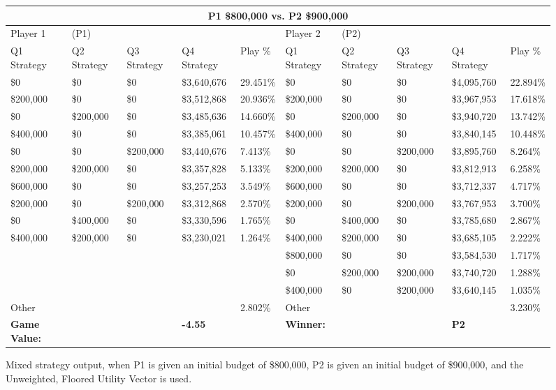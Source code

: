 \documentclass[11pt]{article}
\begin{document}
\begin{figure}
\tiny
\begin{tabular}{ |p{1.0cm}p{1.0cm}p{1.0cm}p{2.0cm}|p{1.0cm}||p{1.0cm}p{1.0cm}p{1.0cm}p{2.0cm}|p{1.0cm}|}
\hline
\multicolumn{10}{|c|}{P1 \$800,000 vs. P2 \$900,000} \\
\hline
Player 1 & (P1) & & & & Player 2 & (P2) & & & \\
\hline
Q1 Strategy & Q2 Strategy & Q3 Strategy & Q4 Strategy  &  Play \% & Q1 Strategy & Q2 Strategy & Q3 Strategy & Q4 Strategy  &  Play \%\\
\hline
\$0 & \$0 & \$0 & \$3,640,676 & 29.451\%            & \$0 & \$0 & \$0 & \$4,095,760 & 22.894\%\\
\$200,000 & \$0 & \$0 & \$3,512,868 & 20.936\%      & \$200,000 & \$0 & \$0 & \$3,967,953 & 17.618\%\\
\$0 & \$200,000 & \$0 & \$3,485,636 & 14.660\%      & \$0 & \$200,000 & \$0 & \$3,940,720 & 13.742\%\\
\$400,000 & \$0 & \$0 & \$3,385,061 & 10.457\%      & \$400,000 & \$0 & \$0 & \$3,840,145 & 10.448\%\\
\$0 & \$0 & \$200,000 & \$3,440,676 & 7.413\%       & \$0 & \$0 & \$200,000 & \$3,895,760 & 8.264\%\\
\$200,000 & \$200,000 & \$0 & \$3,357,828 & 5.133\% & \$200,000 & \$200,000 & \$0 & \$3,812,913 & 6.258\%\\
\$600,000 & \$0 & \$0 & \$3,257,253 & 3.549\%       & \$600,000 & \$0 & \$0 & \$3,712,337 & 4.717\%\\
\$200,000 & \$0 & \$200,000 & \$3,312,868 & 2.570\% & \$200,000 & \$0 & \$200,000 & \$3,767,953 & 3.700\%\\
\$0 & \$400,000 & \$0 & \$3,330,596 & 1.765\%       & \$0 & \$400,000 & \$0 & \$3,785,680 & 2.867\%\\
\$400,000 & \$200,000 & \$0 & \$3,230,021 & 1.264\% & \$400,000 & \$200,000 & \$0 & \$3,685,105 & 2.222\%\\
& & & &                                            & \$800,000 & \$0 & \$0 & \$3,584,530 & 1.717\%\\
& & & &                                            & \$0 & \$200,000 & \$200,000 & \$3,740,720 & 1.288\%\\
& & & &                                            & \$400,000 & \$0 & \$200,000 & \$3,640,145 & 1.035\%\\
\hline
Other & & & & 2.802\%                               & Other & & & & 3.230\% \\
\hline
\small \textbf{Game Value:} &&& \small \textbf{-4.55} && \small \textbf{Winner:} &&& \small \textbf{P2}&\\
\hline
\end{tabular}
\caption{Mixed strategy output, when P1 is given an initial budget of \$800,000, P2 is given an initial budget of \$900,000, and the Unweighted, Floored Utility Vector is used.}
\label{8v9table.1}
\end{figure}
\end{document}

